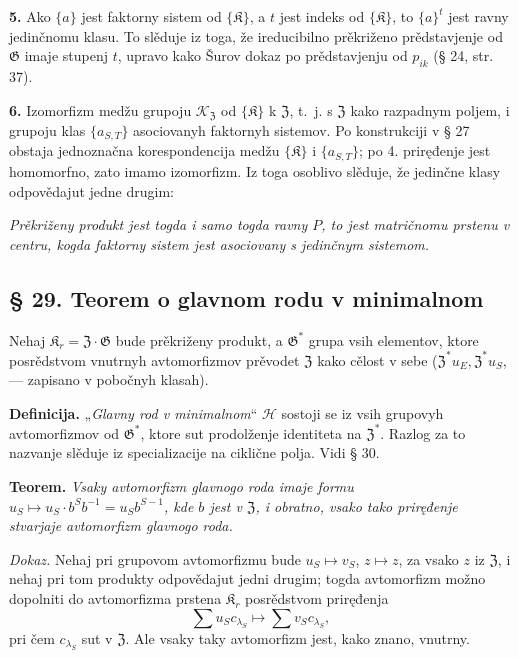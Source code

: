 \documentclass[11pt]{article}
\begin{document}
\noindent\textbf{5.} Ako \(\{a\}\) jest faktorny sistem od \(\{\mathfrak K\}\), a \(t\) jest indeks od \(\{\mathfrak K\}\), to \(\{a\}^t\) jest ravny jedinčnomu klasu. To slěduje iz toga, že ireducibilno prěkriženo prědstavjenje od \(\mathfrak G\) imaje stupenj \(t\), upravo kako Šurov dokaz po prědstavjenju od \(p_{ik}\) (§ 24, str. 37).

\noindent\textbf{6.} Izomorfizm medžu grupoju \(\mathscr K_{\mathfrak Z}\) od \(\{\mathfrak K\}\) k \(\mathfrak Z\), t.~j. s \(\mathfrak Z\) kako razpadnym poljem, i grupoju klas \(\{a_{S,T}\}\) asociovanyh faktornyh sistemov. Po konstrukciji v § 27 obstaja jednoznačna korespondencija medžu \(\{\mathfrak K\}\) i \(\{a_{S,T}\}\); po 4. priręđenje jest homomorfno, zato imamo izomorfizm. Iz toga osoblivo slěduje, že jedinčne klasy odpovědajut jedne drugim:

\noindent\emph{Prěkriženy produkt jest togda i samo togda ravny \(P\), to jest matričnomu prstenu v centru, kogda faktorny sistem jest asociovany s jedinčnym sistemom.}

\subsection*{§ 29. Teorem o glavnom rodu v minimalnom}\label{hauptgeschlechtssatz-im-minimalen}

Nehaj \(\mathfrak K_r=\mathfrak Z\cdot\mathfrak G\) bude prěkriženy produkt, a \(\mathfrak G^*\) grupa vsih elementov, ktore posrědstvom vnutrnyh avtomorfizmov prěvodet \(\mathfrak Z\) kako cělost v sebe (\(\mathfrak Z^*u_E,\mathfrak Z^*u_S\), --- zapisano v pobočnyh klasah).

\noindent\textbf{Definicija.} „\emph{Glavny rod v minimalnom}“ \(\mathscr H\) sostoji se iz vsih grupovyh avtomorfizmov od \(\mathfrak G^*\), ktore sut prodolženje identiteta na \(\mathfrak Z^*\). Razlog za to nazvanje slěduje iz specializacije na ciklične polja. Vidi § 30.

\noindent\textbf{Teorem.} \emph{Vsaky avtomorfizm glavnogo roda imaje formu \(u_S\mapsto u_S\cdot b^Sb^{-1}=u_Sb^{S-1}\), kde \(b\) jest v \(\mathfrak Z\), i obratno, vsako tako priręđenje stvarjaje avtomorfizm glavnogo roda.}

\noindent\emph{Dokaz.} Nehaj pri grupovom avtomorfizmu bude \(u_S\mapsto v_S\), \(z\mapsto z\), za vsako \(z\) iz \(\mathfrak Z\), i nehaj pri tom produkty odpovědajut jedni drugim; togda avtomorfizm možno dopolniti do avtomorfizma prstena \(\mathfrak K_r\) posrědstvom priręđenja
\[
\sum u_Sc_{\lambda_S}\mapsto\sum v_Sc_{\lambda_S},
\]
pri čem \(c_{\lambda_S}\) sut v \(\mathfrak Z\). Ale vsaky taky avtomorfizm jest, kako znano, vnutrny.
\end{document}
